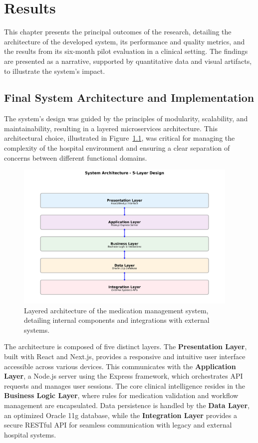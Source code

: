 \chapter{Results}

This chapter presents the principal outcomes of the research, detailing the architecture of the developed system, its performance and quality metrics, and the results from its six-month pilot evaluation in a clinical setting. The findings are presented as a narrative, supported by quantitative data and visual artifacts, to illustrate the system's impact.

\section{Final System Architecture and Implementation}

The system's design was guided by the principles of modularity, scalability, and maintainability, resulting in a layered microservices architecture. This architectural choice, illustrated in Figure~\ref{fig:architecture}, was critical for managing the complexity of the hospital environment and ensuring a clear separation of concerns between different functional domains.

\begin{figure}[htbp]
    \centering
    \includegraphics[width=0.95\textwidth]{images/generated/system_architecture.png}
    \caption{Layered architecture of the medication management system, detailing internal components and integrations with external systems.}
    \label{fig:architecture}
\end{figure}

The architecture is composed of five distinct layers. The \textbf{Presentation Layer}, built with React and Next.js, provides a responsive and intuitive user interface accessible across various devices. This communicates with the \textbf{Application Layer}, a Node.js server using the Express framework, which orchestrates API requests and manages user sessions. The core clinical intelligence resides in the \textbf{Business Logic Layer}, where rules for medication validation and workflow management are encapsulated. Data persistence is handled by the \textbf{Data Layer}, an optimized Oracle 11g database, while the \textbf{Integration Layer} provides a secure RESTful API for seamless communication with legacy and external hospital systems.

